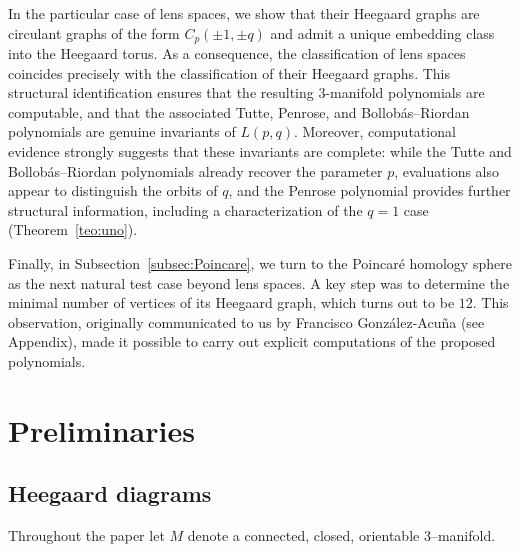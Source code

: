 \documentclass[pdflatex,sn-mathphys-num]{sn-jnl}%
\theoremstyle{plain}
\theoremstyle{definition}
\theoremstyle{remark}
\begin{document}
In the particular case of lens spaces, we show that their Heegaard graphs are circulant graphs of the form $C_p(\pm 1,\pm q)$ and admit a unique embedding class into the Heegaard torus. As a consequence, the classification of lens spaces coincides precisely with the classification of their Heegaard graphs. This structural identification ensures that the resulting $3$-manifold polynomials are computable, and that the associated Tutte, Penrose, and Bollobás–Riordan polynomials are genuine invariants of $L(p,q)$. Moreover, computational evidence strongly suggests that these invariants are complete: while the Tutte and Bollobás–Riordan polynomials already recover the parameter $p$, evaluations also appear to distinguish the orbits of $q$, and the Penrose polynomial provides further structural information, including a characterization of the $q=1$ case (Theorem~\ref{teo:uno}).

Finally, in Subsection~\ref{subsec:Poincare}, we turn to the Poincaré homology sphere as the next natural test case beyond lens spaces. A key step was to determine the minimal number of vertices of its Heegaard graph, which turns out to be $12$. This observation, originally communicated to us by Francisco González-Acuña (see Appendix), made it possible to carry out explicit computations of the proposed polynomials. 

\section{Preliminaries}\label{Preliminaries}

\subsection{Heegaard diagrams}\label{subsec:Heegaard}

Throughout the paper let $M$ denote a connected, closed, orientable
$3$--manifold. 
\end{document}
